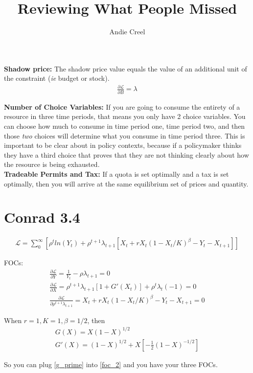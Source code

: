 \documentclass[12pt]{article}
\title{Reviewing What People Missed}
\author{Andie Creel}
\begin{document}
\maketitle

\textbf{Shadow price:} The shadow price value equals the value of an additional unit of the constraint (\textit{ie} budget or stock). 
\begin{align}
    \frac{\partial \mathcal{L}}{\partial B} = \lambda
\end{align}


\textbf{Number of Choice Variables:} If you are going to consume the entirety of a resource in three time periods, that means you only have 2 choice variables. You can choose how much to consume in time period one, time period two, and then those \textit{two} choices will determine what you consume in time period three. This is important to be clear about in policy contexts, because if a policymaker thinks they have a third choice that proves that they are not thinking clearly about how the resource is being exhausted. \\

\textbf{Tradeable Permits and Tax:} If a quota is set optimally and a tax is set optimally, then you will arrive at the same equilibrium set of prices and quantity. 

\section{Conrad 3.4}
\begin{align}
    \mathcal{L} = \sum_0^\infty [\rho^t ln(Y_t) + \rho^{t+1} \lambda_{t+1} [X_t + r X_t(1-X_t/K)^\beta - Y_t - X_{t+1}]]
\end{align}

FOCs:
\begin{align}
    \frac{\partial \mathcal{L}}{\partial Y} = \frac{1}{Y_t}- \rho \lambda_{t+1} = 0\\
    \frac{\partial \mathcal{L}}{\partial X} = \rho^{t+1}\lambda_{t+1}[1+ G'(X_t)] + \rho^t \lambda_t(-1) = 0 \label{foc_2}\\
    \frac{\partial \mathcal{L}}{\partial \rho^{t+1}\lambda_{t+1}} = X_t + r X_t(1-X_t/K)^\beta - Y_t - X_{t+1} = 0 
\end{align}

When $r = 1, K = 1, \beta = 1/2$, then  
\begin{align}
    G(X) = X(1-X)^{1/2}\\
    G'(X) = (1-X)^{1/2} + X [-\frac{1}{2}(1 - X)^{-1/2}] \label{g_prime}
\end{align}

So you can plug \ref{g_prime} into \ref{foc_2} and you have your three FOCs. 
\end{document}
